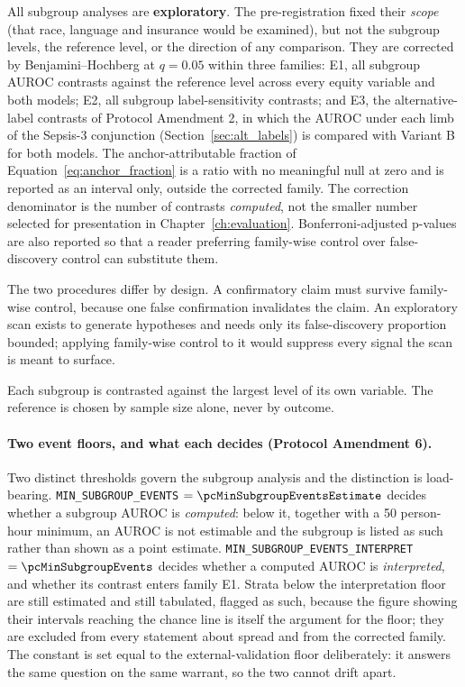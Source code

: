 All subgroup analyses are \textbf{exploratory}. The pre-registration fixed
their \emph{scope} (that race, language and insurance would be examined),
but not the subgroup levels, the reference level, or the direction of any
comparison. They are corrected by Benjamini--Hochberg at $q = 0.05$ within
three families: E1, all subgroup AUROC contrasts against the reference level
across every equity variable and both models; E2, all subgroup
label-sensitivity contrasts; and E3, the alternative-label contrasts of
Protocol Amendment 2, in which the AUROC under each limb of the Sepsis-3
conjunction (Section~\ref{sec:alt_labels}) is compared with Variant B for both
models. The anchor-attributable fraction of
Equation~\ref{eq:anchor_fraction} is a ratio with no meaningful null at zero
and is reported as an interval only, outside the corrected family. The
correction denominator is the number of
contrasts \emph{computed}, not the smaller number selected for presentation in
Chapter~\ref{ch:evaluation}. Bonferroni-adjusted p-values are also reported so
that a reader preferring family-wise control over false-discovery control can
substitute them.

The two procedures differ by design. A confirmatory claim must survive
family-wise control, because one false confirmation invalidates the claim. An
exploratory scan exists to generate hypotheses and needs only its
false-discovery proportion bounded; applying family-wise control to it would
suppress every signal the scan is meant to surface.

Each subgroup is contrasted against the largest level of its own variable. The
reference is chosen by sample size alone, never by outcome.

\paragraph{Two event floors, and what each decides (Protocol Amendment 6).}
Two distinct thresholds govern the subgroup analysis and the distinction is
load-bearing. \texttt{MIN\_SUBGROUP\_EVENTS} $= \pcMinSubgroupEventsEstimate$
decides whether a subgroup AUROC is \emph{computed}: below it, together with a
50 person-hour minimum, an AUROC is not estimable and the subgroup is listed as
such rather than shown as a point estimate.
\texttt{MIN\_SUBGROUP\_EVENTS\_INTERPRET} $= \pcMinSubgroupEvents$ decides
whether a computed AUROC is \emph{interpreted}, and whether its contrast enters
family E1. Strata below the interpretation floor are still estimated and still
tabulated, flagged as such, because the figure showing their intervals reaching
the chance line is itself the argument for the floor; they are excluded from
every statement about spread and from the corrected family. The constant is set
equal to the external-validation floor deliberately: it answers the same
question on the same warrant, so the two cannot drift apart.

